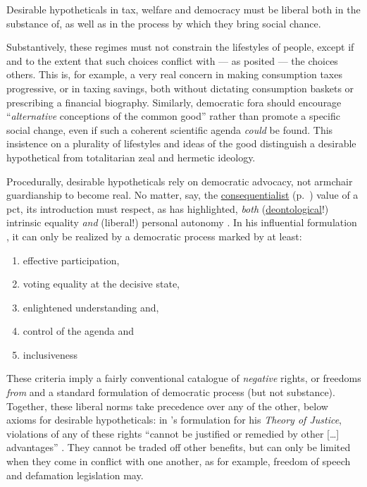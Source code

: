 Desirable hypotheticals in tax, welfare and democracy must be liberal both in the substance of, as well as in the process by which they bring social chance.

Substantively, these regimes must not constrain the lifestyles of people, except if and to the extent that such choices conflict with --- as \citeauthor{Rawls-1971} posited --- the choices others.
This is, for example, a very real concern in making consumption taxes progressive, or in taxing savings, both without dictating consumption baskets or prescribing a financial biography.
Similarly, democratic fora should encourage  ``\emph{alternative} conceptions of the common good'' \citep[18, emphasis added]{Cohen-1989-aa} rather than promote a specific social change, even if such a coherent scientific agenda \emph{could} be found.
This insistence on a plurality of lifestyles and ideas of the good distinguish a desirable hypothetical from totalitarian zeal and hermetic ideology.

Procedurally, desirable hypotheticals rely on democratic advocacy, not armchair guardianship to become real.
No matter, say, the \hyperref[itm:consequentialism]{consequentialist} (p.~\pageref{itm:consequentialism}) value of a \gls{pct}, its introduction must respect, as \citeauthor{Dahl-1989-aa} has highlighted, \emph{both} (\hyperref[itm:deontological]{deontological}!) intrinsic equality \citeyearpar[84]{Dahl-1989-aa} \emph{and} (liberal!) personal autonomy \citeyearpar[97ff]{Dahl-1989-aa}.
In his influential formulation \citep[109ff.]{Dahl-1989-aa}, it can only be realized by a democratic process marked by at least:

\begin{enumerate}
	\item effective participation,
	\item voting equality at the decisive state,
	\item enlightened understanding and,
	\item control of the agenda and
	\item inclusiveness %
\end{enumerate}

These criteria imply a fairly conventional catalogue of \emph{negative} rights, or freedoms \emph{from} and a standard formulation of democratic process (but not substance).
Together, these liberal norms take precedence over any of the other, below axioms for desirable hypotheticals:
in \citeauthor{Rawls-1971}'s formulation for his \emph{Theory of Justice}, violations of any of these rights ``cannot be justified or remedied by other [\ldots] advantages'' \citeyearpar[81]{Rawls-1971}.
They cannot be traded off other benefits, but can only be limited when they come in conflict with one another, as for example, freedom of speech and defamation legislation may.

